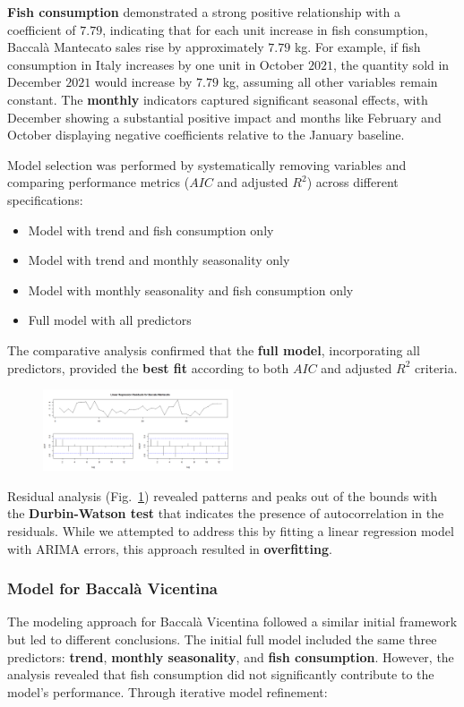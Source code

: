 \documentclass[10pt,twocolumn,letterpaper]{article}
\begin{document}
\textbf{Fish consumption} demonstrated a strong positive relationship with a coefficient of $7.79$, indicating that for each unit increase in fish consumption, Baccalà Mantecato sales rise by approximately $7.79$ kg. For example, if fish consumption in Italy increases by one unit in October $2021$, the quantity sold in December $2021$ would increase by $7.79$ kg, assuming all other variables remain constant.
The \textbf{monthly} indicators captured significant seasonal effects, with December showing a substantial positive impact and months like February and October displaying negative coefficients relative to the January baseline.

Model selection was performed by systematically removing variables and comparing performance metrics ($AIC$ and adjusted $R^2$) across different specifications:
\begin{itemize}[noitemsep, topsep=0pt]
    \item Model with trend and fish consumption only
    \item Model with trend and monthly seasonality only
    \item Model with monthly seasonality and fish consumption only
    \item Full model with all predictors
\end{itemize}
The comparative analysis confirmed that the \textbf{full model}, incorporating all predictors, provided the \textbf{best fit} according to both $AIC$ and adjusted $R^2$ criteria.

\begin{figure}[H]
    \centering
    \includegraphics[width=0.5\textwidth]{PlotsBEFD/RES_LR_MAN.png} 
    \caption{}
    \label{fig:RES_LR_MAN}
\end{figure}

Residual analysis (Fig.~\ref{fig:RES_LR_MAN}) revealed patterns and peaks out of the bounds with the \textbf{Durbin-Watson test} that indicates the presence of autocorrelation in the residuals. While we attempted to address this by fitting a linear regression model with ARIMA errors, this approach resulted in \textbf{overfitting}.

\subsubsection{Model for Baccalà Vicentina}
The modeling approach for Baccalà Vicentina followed a similar initial framework but led to different conclusions. The initial full model included the same three predictors: \textbf{trend}, \textbf{monthly seasonality}, and \textbf{fish consumption}. However, the analysis revealed that fish consumption did not significantly contribute to the model's performance.
Through iterative model refinement:
\end{document}
